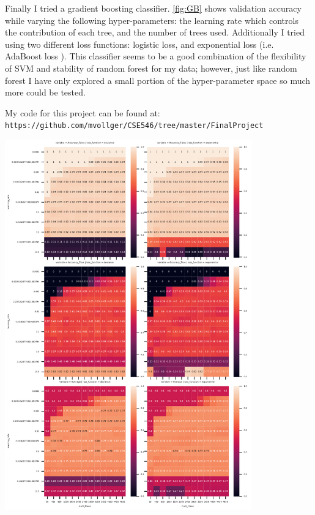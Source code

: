 \documentclass{article}
\begin{document}
Finally I tried a gradient boosting classifier.  \autoref{fig:GB} shows validation accuracy while varying the following hyper-parameters: the learning rate which controls the contribution of each tree, and the number of trees used. Additionally I tried using two different loss functions: logistic loss, and exponential loss (i.e. AdaBoost loss \parencite{Freund1997ABoosting}). This classifier seems to be a good combination of the flexibility of SVM and stability of random forest for my data; however, just like random forest I have only explored a small portion of the hyper-parameter space so much more could be tested. 

My code for this project can be found at: \\
\texttt{https://github.com/mvollger/CSE546/tree/master/FinalProject}


\begin{center}
    \includegraphics[width=0.8\textwidth]{FinalProject/GB_heat.pdf}
    \label{fig:GB}
\end{center}
\end{document}
